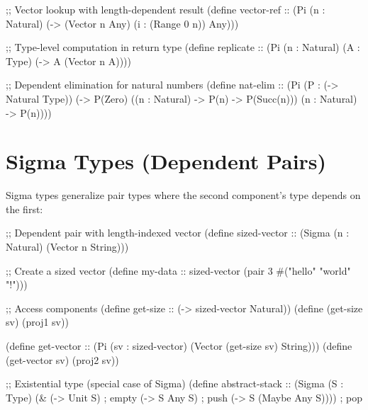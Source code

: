 \begin{example}[Pi Types]
\begin{lambdustcode}
;; Vector lookup with length-dependent result
(define vector-ref :: (Pi (n : Natural) 
                         (-> (Vector n Any) 
                             (i : (Range 0 n)) 
                             Any)))

;; Type-level computation in return type  
(define replicate :: (Pi (n : Natural) (A : Type) 
                         (-> A (Vector n A))))

;; Dependent elimination for natural numbers
(define nat-elim :: (Pi (P : (-> Natural Type))
                        (-> P(Zero)
                            ((n : Natural) -> P(n) -> P(Succ(n)))
                            (n : Natural) -> P(n))))
\end{lambdustcode}
\end{example}

\section{Sigma Types (Dependent Pairs)}
\label{sec:sigma-types}


Sigma types generalize pair types where the second component's type depends on the first:

\begin{grammar}
\end{grammar}

\begin{example}
\begin{lambdustcode}
;; Dependent pair with length-indexed vector
(define sized-vector :: (Sigma (n : Natural) (Vector n String)))

;; Create a sized vector
(define my-data :: sized-vector
  (pair 3 #("hello" "world" "!")))

;; Access components
(define get-size :: (-> sized-vector Natural))
(define (get-size sv) (proj1 sv))

(define get-vector :: (Pi (sv : sized-vector) 
                          (Vector (get-size sv) String)))
(define (get-vector sv) (proj2 sv))

;; Existential type (special case of Sigma)
(define abstract-stack :: (Sigma (S : Type)
                                 (& (-> Unit S)           ; empty
                                    (-> S Any S)          ; push  
                                    (-> S (Maybe Any S)))) ; pop
\end{lambdustcode}
\end{example}

